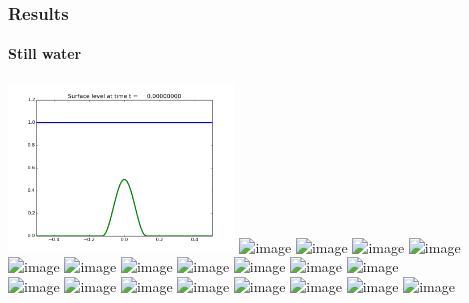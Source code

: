 \documentclass[handout]{beamer}
\begin{document}
\begin{frame}
  \frametitle{Results}
  \framesubtitle{Still water}
  \begin{center}
    \includegraphics[width=0.45\textwidth]{../results/still-cosine-initial.png}
    \includegraphics<1| handout:0>[width=0.45\textwidth]{../results/still-cosine-unbalanced-01.png}
    \includegraphics<2| handout:0>[width=0.45\textwidth]{../results/still-cosine-unbalanced-02.png}
    \includegraphics<3| handout:0>[width=0.45\textwidth]{../results/still-cosine-unbalanced-03.png}
    \includegraphics<4| handout:0>[width=0.45\textwidth]{../results/still-cosine-unbalanced-04.png}
    \includegraphics<5| handout:0>[width=0.45\textwidth]{../results/still-cosine-unbalanced-05.png}
    \includegraphics<6| handout:0>[width=0.45\textwidth]{../results/still-cosine-unbalanced-06.png}
    \includegraphics<7| handout:0>[width=0.45\textwidth]{../results/still-cosine-unbalanced-07.png}
    \includegraphics<8| handout:0>[width=0.45\textwidth]{../results/still-cosine-unbalanced-08.png}
    \includegraphics<9| handout:0>[width=0.45\textwidth]{../results/still-cosine-unbalanced-09.png}
    \includegraphics<10| handout:0>[width=0.45\textwidth]{../results/still-cosine-unbalanced-10.png}
    \includegraphics<11>[width=0.45\textwidth]{../results/still-cosine-unbalanced-11.png} \\
    \includegraphics<1| handout:0>[width=0.45\textwidth]{../results/still-cosine-rogers-01.png}
    \includegraphics<2| handout:0>[width=0.45\textwidth]{../results/still-cosine-rogers-02.png}
    \includegraphics<3| handout:0>[width=0.45\textwidth]{../results/still-cosine-rogers-03.png}
    \includegraphics<4| handout:0>[width=0.45\textwidth]{../results/still-cosine-rogers-04.png}
    \includegraphics<5| handout:0>[width=0.45\textwidth]{../results/still-cosine-rogers-05.png}
    \includegraphics<6| handout:0>[width=0.45\textwidth]{../results/still-cosine-rogers-06.png}
    \includegraphics<7| handout:0>[width=0.45\textwidth]{../results/still-cosine-rogers-07.png}
    \includegraphics<8| handout:0>[width=0.45\textwidth]{../results/still-cosine-rogers-08.png}

\end{center}
\end{frame}
\end{document}

